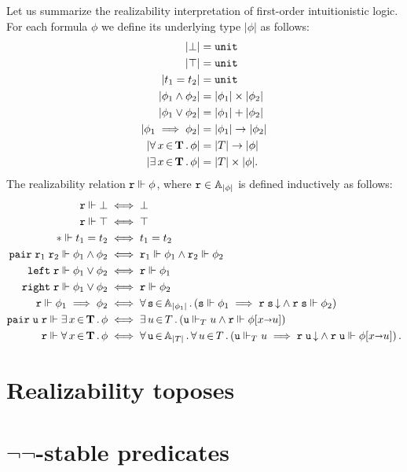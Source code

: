 Let us summarize the realizability interpretation of first-order
intuitionistic logic. For each formula $\phi$ we define its underlying
type $|\phi|$ as follows:
%
\begin{align*}
  |\bot| &= \mathtt{unit} \\
  |\top| &= \mathtt{unit} \\
  |t_1 = t_2| &= \mathtt{unit} \\
  |\phi_1 \land \phi_2| &= |\phi_1| \times |\phi_2|\\
  |\phi_1 \lor \phi_2| &= |\phi_1| + |\phi_2|\\
  |\phi_1 \implies \phi_2| &= |\phi_1| \to |\phi_2|\\
  |\forall\, x \,{\in}\, \mathbf{T}\,.\,\phi| &= |T| \to |\phi| \\
  |\exists\, x \,{\in}\, \mathbf{T}\,.\,\phi| &= |T| \times |\phi|.
\end{align*}
%
The realizability relation $\mathtt{r} \Vdash \phi$, where $\mathtt{r} \in
\mathbb{A}_{|\phi|}$ is defined inductively as follows:
%
\begin{align*}
  \mathtt{r} \Vdash \bot &\iff \bot\\
  \mathtt{r} \Vdash \top &\iff \top\\
  {*} \Vdash t_1 = t_2 &\iff t_1 = t_2\\
  \mathtt{pair}\;\mathtt{r}_1\;\mathtt{r}_2 \Vdash \phi_1 \land \phi_2 &\iff
  \mathtt{r}_1 \Vdash \phi_1 \land \mathtt{r}_2 \Vdash \phi_2\\
  \mathtt{left}\;\mathtt{r} \Vdash \phi_1 \lor \phi_2 &\iff \mathtt{r} \Vdash \phi_1\\
  \mathtt{right}\;\mathtt{r} \Vdash \phi_1 \lor \phi_2 &\iff \mathtt{r} \Vdash \phi_2\\
  \mathtt{r} \Vdash \phi_1 \implies \phi_2 &\iff
  \forall\, \mathtt{s} \,{\in}\, \mathbb{A}_{|\phi_1|}\,.\left(\mathtt{s} \Vdash \phi_1 \implies
    \mathtt{r}\;\mathtt{s}\,{\downarrow} \land \mathtt{r}\;\mathtt{s} \Vdash \phi_2
  \right)\\
  \mathtt{pair}\;\mathtt{u}\;\mathtt{r} \Vdash \exists\, x \,{\in}\, \mathbf{T}\,.\,\phi &\iff
  \exists\, u \,{\in}\, T\,.\left(\mathtt{u} \Vdash_T u \land \mathtt{r} \Vdash \phi[x {\shortrightarrow} u]\right)
  \\
  \mathtt{r} \Vdash \forall\, x \,{\in}\, \mathbf{T}\,.\,\phi &\iff
  \forall\, \mathtt{u} \,{\in}\, \mathbb{A}_{|T|}\,.\,
    \forall\, u \,{\in}\, T\,.\left(
      \mathtt{u} \Vdash_T u \implies
      \mathtt{r}\;\mathtt{u}\,{\downarrow} \land \mathtt{r}\;\mathtt{u} \Vdash \phi[x {\shortrightarrow} u]
    \right).
\end{align*}
%

\section{Realizability toposes}
\label{sec:realizability-toposes}


\section[\texorpdfstring{$\neg\neg$-stable predicates}{Not-not-stable predicates}]{$\neg\neg$-stable predicates}
\label{sec:decidable-predicates}

